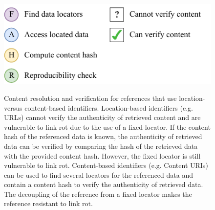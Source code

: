 \begin{figure}[ht] %


\centering
{} \\
 \\
 \\
\includegraphics[scale=.9]{figures/fig4legend.pdf}%

\caption{Content resolution and verification for references that use location- versus content-based identifiers.  Location-based identifiers (e.g. URLs) cannot verify the authenticity of retrieved content and are vulnerable to link rot due to the use of a fixed locator.  If the content hash of the referenced data is known, the authenticity of retrieved data can be verified by comparing the hash of the retrieved data with the provided content hash. However, the fixed locator is still vulnerable to link rot.  Content-based identifiers (e.g. Content URIs) can be used to find several locators for the referenced data and contain a content hash to verify the authenticity of retrieved data. The decoupling of the reference from a fixed locator makes the reference resistant to link rot.
}%

\label{fig:verification} %

\end{figure}
